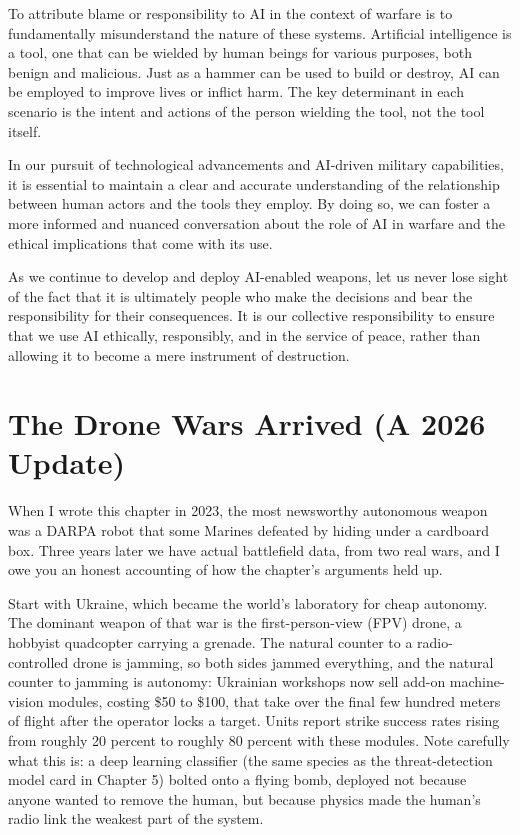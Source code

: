To attribute blame or responsibility to AI in the context of warfare is to fundamentally misunderstand the nature of these systems. Artificial intelligence is a tool, one that can be wielded by human beings for various purposes, both benign and malicious. Just as a hammer can be used to build or destroy, AI can be employed to improve lives or inflict harm. The key determinant in each scenario is the intent and actions of the person wielding the tool, not the tool itself.

In our pursuit of technological advancements and AI-driven military capabilities, it is essential to maintain a clear and accurate understanding of the relationship between human actors and the tools they employ. By doing so, we can foster a more informed and nuanced conversation about the role of AI in warfare and the ethical implications that come with its use.

As we continue to develop and deploy AI-enabled weapons, let us never lose sight of the fact that it is ultimately people who make the decisions and bear the responsibility for their consequences. It is our collective responsibility to ensure that we use AI ethically, responsibly, and in the service of peace, rather than allowing it to become a mere instrument of destruction.

\section{The Drone Wars Arrived (A 2026 Update)}

When I wrote this chapter in 2023, the most newsworthy autonomous weapon was a DARPA robot that some Marines defeated by hiding under a cardboard box. Three years later we have actual battlefield data, from two real wars, and I owe you an honest accounting of how the chapter's arguments held up.

Start with Ukraine, which became the world's laboratory for cheap autonomy. The dominant weapon of that war is the first-person-view (FPV) drone, a hobbyist quadcopter carrying a grenade. The natural counter to a radio-controlled drone is jamming, so both sides jammed everything, and the natural counter to jamming is autonomy: Ukrainian workshops now sell add-on machine-vision modules, costing \$50 to \$100, that take over the final few hundred meters of flight after the operator locks a target. Units report strike success rates rising from roughly 20 percent to roughly 80 percent with these modules. Note carefully what this is: a deep learning classifier (the same species as the threat-detection model card in Chapter 5) bolted onto a flying bomb, deployed not because anyone wanted to remove the human, but because physics made the human's radio link the weakest part of the system.

